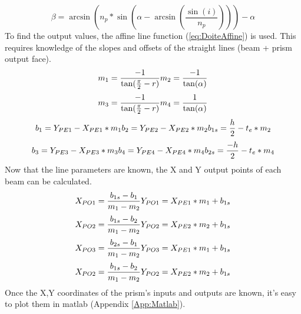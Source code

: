 \begin{equation}
    \beta = \arcsin(n_p*\sin(\alpha-\arcsin(\frac{\sin(i)}{n_p})))-\alpha
\end{equation}
To find the output values, the affine line function (\ref{eq:DoiteAffine}) is used.
This requires knowledge of the slopes and offsets of the straight lines (beam + prism output face).
\begin{equation}
    m_1 = \frac{-1}{\tan(\frac{\pi}{2}-r)}\newline
    m_2 = \frac{-1}{\tan(\alpha)}
\end{equation}
\begin{equation}
    m_3 = \frac{-1}{\tan(\frac{\pi}{2}-r)}\newline
    m_4 = \frac{1}{\tan(\alpha)}
\end{equation}
\begin{equation}
    b_1 = Y_{PE1}-X_{PE1}*m_1\newline
    b_2 = Y_{PE2}-X_{PE2}*m_2\newline
    b_{1s} = \frac{h}{2}-t_e*m_2
\end{equation}
\begin{equation}
    b_3 = Y_{PE3}-X_{PE3}*m_3\newline
    b_4 = Y_{PE4}-X_{PE4}*m_4\newline
    b_{2s} = \frac{-h}{2}-t_e*m_4
\end{equation}
Now that the line parameters are known, the X and Y output points of each beam can be calculated.
\begin{equation}
    X_{PO1} = \frac{b_{1s}-b_1}{m_1-m_2}\newline
    Y_{PO1} = X_{PE1}*m_1+b_{1s}
\end{equation}
\begin{equation}
    X_{PO2} = \frac{b_{1s}-b_2}{m_1-m_2}\newline
    Y_{PO2} = X_{PE2}*m_2+b_{1s}
\end{equation}
\begin{equation}
    X_{PO3} = \frac{b_{2s}-b_1}{m_1-m_2}\newline
    Y_{PO3} = X_{PE1}*m_1+b_{1s}
\end{equation}
\begin{equation}
    X_{PO2} = \frac{b_{1s}-b_2}{m_1-m_2}\newline
    Y_{PO2} = X_{PE2}*m_2+b_{1s}
\end{equation}
Once the X,Y coordinates of the prism's inputs and outputs are known, it's easy to plot them in matlab (Appendix \ref{App:Matlab}).
